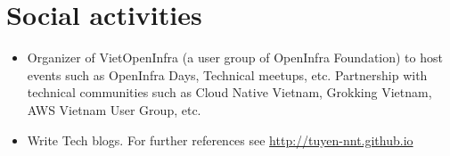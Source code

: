 \documentclass[letterpaper,11pt]{article}
\newcommand{\resumeItemNornal}[1]{
  \item\small{
    {#1 \vspace{-2pt}}
  }
}
\newcommand{\resumeSubItemNormal}[1]{\resumeItemNornal{#1}\vspace{-4pt}}
\newcommand{\resumeSubHeadingListStart}{\begin{itemize}[leftmargin=*]}
\newcommand{\resumeSubHeadingListEnd}{\end{itemize}}
\begin{document}
\section{Social activities}
  \resumeSubHeadingListStart
    \resumeSubItemNormal
      {Organizer of VietOpenInfra (a user group of OpenInfra Foundation) to host events such as OpenInfra Days, Technical meetups, etc. Partnership with technical communities such as Cloud Native Vietnam, Grokking Vietnam, AWS Vietnam User Group, etc.}
    \resumeSubItemNormal
      {Write Tech blogs. For further references see \url{http://tuyen-nnt.github.io}}
\resumeSubHeadingListEnd



\end{document}
